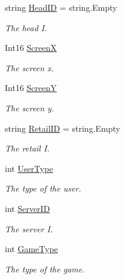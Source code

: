 \begin{DoxyCompactItemize}
string \mbox{\hyperlink{class_t_net_1_1_contract_1_1_action_1_1_login_action_abbcd92ab638dc2fc171ef8310424e9d5}{Head\+ID}} = string.\+Empty
\begin{DoxyCompactList}\small\item\em The head I. \end{DoxyCompactList}\item 
Int16 \mbox{\hyperlink{class_t_net_1_1_contract_1_1_action_1_1_login_action_a07399f95476bf1fe72780a95789e9a12}{ScreenX}}
\begin{DoxyCompactList}\small\item\em The screen x. \end{DoxyCompactList}\item 
Int16 \mbox{\hyperlink{class_t_net_1_1_contract_1_1_action_1_1_login_action_a4eb99d885efdf97331ee79371e7d8280}{ScreenY}}
\begin{DoxyCompactList}\small\item\em The screen y. \end{DoxyCompactList}\item 
string \mbox{\hyperlink{class_t_net_1_1_contract_1_1_action_1_1_login_action_a254b740791128ce8e81079a2db472db5}{Retail\+ID}} = string.\+Empty
\begin{DoxyCompactList}\small\item\em The retail I. \end{DoxyCompactList}\item 
int \mbox{\hyperlink{class_t_net_1_1_contract_1_1_action_1_1_login_action_aa1c17e3fcec110d360c533da3f32ec31}{User\+Type}}
\begin{DoxyCompactList}\small\item\em The type of the user. \end{DoxyCompactList}\item 
int \mbox{\hyperlink{class_t_net_1_1_contract_1_1_action_1_1_login_action_aebfb80b612500108dedaa2bacc10d093}{Server\+ID}}
\begin{DoxyCompactList}\small\item\em The server I. \end{DoxyCompactList}\item 
int \mbox{\hyperlink{class_t_net_1_1_contract_1_1_action_1_1_login_action_ac7b7e0e031e1b81166b5731dfa2edcd6}{Game\+Type}}
\begin{DoxyCompactList}\small\item\em The type of the game. \end{DoxyCompactList}\end{DoxyCompactItemize}
